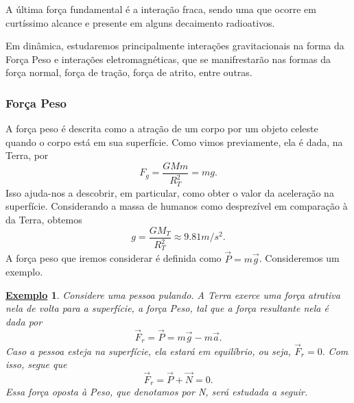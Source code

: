 \documentclass{article}
\newtheorem{example}{\underline{Exemplo}}
\begin{document}
  A \'ultima for\c ca fundamental \'e a intera\c c\~ao fraca, sendo uma que ocorre em curt\'issimo alcance e presente em alguns
  decaimento radioativos.

  Em din\^amica, estudaremos principalmente intera\c c\~oes gravitacionais na forma da For\c ca Peso e intera\c c\~oes eletromagn\'eticas,
  que se manifrestar\~ao nas formas da for\c ca normal, for\c ca de tra\c c\~ao, for\c ca de atrito, entre outras.

  \subsubsection{For\c ca Peso}
    A for\c ca peso \'e descrita como a atra\c c\~ao de um corpo por um objeto celeste quando o corpo est\'a em sua superf\'icie.
    Como vimos previamente, ela \'e dada, na Terra, por 
      $$
        F_{g} = \frac{GMm}{R_{T}^{2}} = mg.
      $$
    Isso ajuda-nos a descobrir, em particular, como obter o valor da acelera\c c\~ao na superf\'icie. Considerando a massa
    de humanos como desprez\'ivel em compara\c c\~ao \`a da Terra, obtemos 
      $$
        g = \frac{GM_{T}}{R_{T}^{2}}\approx 9.81m/s^{2}.
      $$
      A for\c ca peso que iremos considerar \'e definida como $\vec{P} = m \vec{g}$. Consideremos um exemplo.

 \begin{example}
   Considere uma pessoa pulando. A Terra exerce uma for\c ca atrativa nela de volta para a superf\'icie, a for\c ca Peso, tal que
   a for\c ca resultante nela \'e dada por 
     $$
       \vec{F}_r = \vec{P} = m \vec{g} - m \vec{a}.
     $$
     Caso a pessoa esteja na superf\'icie, ela estar\'a em equil\'ibrio, ou seja, $\vec{F}_{r} = 0.$ Com isso, segue que 
       $$
       \vec{F}_{r} = \vec{P} + \vec{N} = 0.
       $$
    Essa for\c ca oposta \`a Peso, que denotamos por N, ser\'a estudada a seguir.
   \end{example}
  
\end{document}
